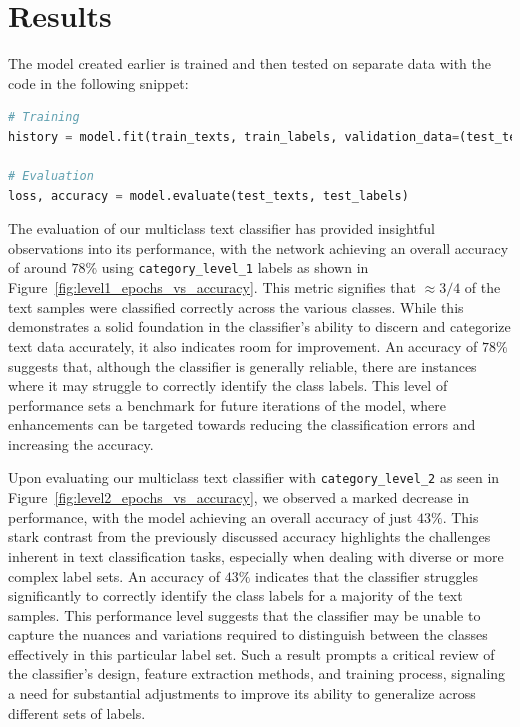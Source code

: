 \section{Results}
The model created earlier is trained and then tested on separate data with the code in the following snippet:
\begin{lstlisting}[language=Python]
# Training
history = model.fit(train_texts, train_labels, validation_data=(test_texts, test_labels), epochs=epochs, batch_size=batch_size, use_multiprocessing=True)

# Evaluation
loss, accuracy = model.evaluate(test_texts, test_labels)
\end{lstlisting}

The evaluation of our multiclass text classifier has provided insightful observations into its performance, with the network achieving an overall accuracy of around $78\%$ using \verb|category_level_1| labels as shown in Figure~\ref{fig:level1_epochs_vs_accuracy}.
This metric signifies that $\approx 3/4$ of the text samples were classified correctly across the various classes.
While this demonstrates a solid foundation in the classifier's ability to discern and categorize text data accurately, it also indicates room for improvement.
An accuracy of $78\%$ suggests that, although the classifier is generally reliable, there are instances where it may struggle to correctly identify the class labels.
This level of performance sets a benchmark for future iterations of the model, where enhancements can be targeted towards reducing the classification errors and increasing the accuracy.

Upon evaluating our multiclass text classifier with \verb|category_level_2| as seen in Figure~\ref{fig:level2_epochs_vs_accuracy}, we observed a marked decrease in performance, with the model achieving an overall accuracy of just $43\%$. This stark contrast from the previously discussed accuracy highlights the challenges inherent in text classification tasks, especially when dealing with diverse or more complex label sets. An accuracy of $43\%$ indicates that the classifier struggles significantly to correctly identify the class labels for a majority of the text samples. This performance level suggests that the classifier may be unable to capture the nuances and variations required to distinguish between the classes effectively in this particular label set. Such a result prompts a critical review of the classifier’s design, feature extraction methods, and training process, signaling a need for substantial adjustments to improve its ability to generalize across different sets of labels.

